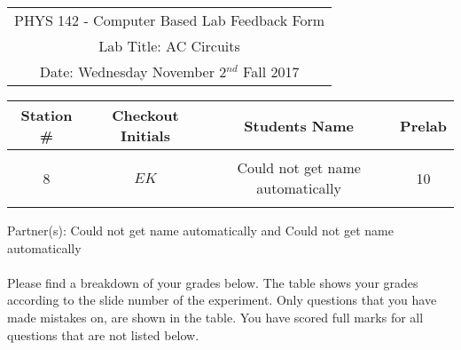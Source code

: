 \documentclass{article}
\begin{document}

\begin{table}[h]
	\centering
	\begin{tabular}{c}
	PHYS 142 - Computer Based Lab Feedback Form\\
	Lab Title: AC Circuits\\Date: Wednesday November 2$^{nd}$ Fall 2017 \\\hline
\end{tabular}
\end{table}
\begin{table}[h]\centering \begin{tabular}{|c|c|p{9.9 cm}|c|}\hline Station \#  & Checkout Initials & \multicolumn{1}{|c|}{Students Name} & Prelab \\\hline\multirow{3}{*}{8}& \multirow{3}{*}{$EK$} & &\\& &\multicolumn{1}{|c|}{Could not get name automatically}&10\\&   &  &\\\hline
\end{tabular}
\end{table}
Partner(s): Could not get name automatically and Could not get name automatically\\
\\Please find a breakdown of your grades below. The table shows your grades according to the slide number of the experiment. Only questions that you have made mistakes on, are shown in the table. You have scored full marks for all questions that are not listed below.
\end{document}
